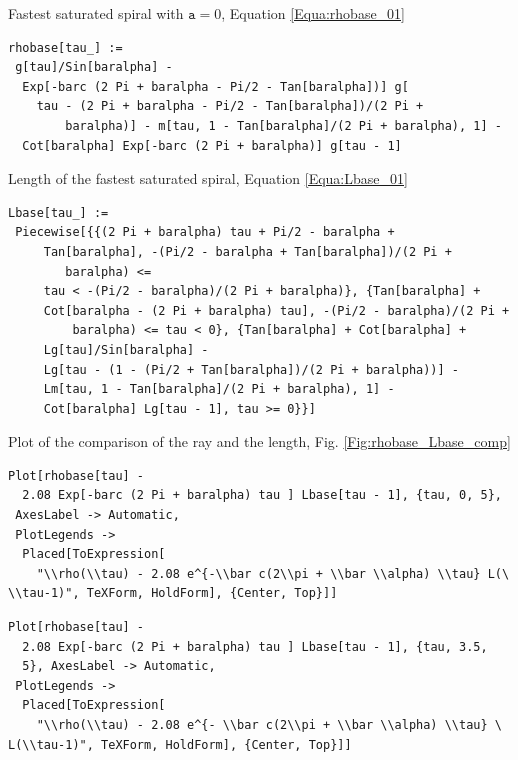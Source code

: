 \documentclass[reqno]{amsart}
\theoremstyle{definition} \newtheorem{definition}{Definition}[section]
\theoremstyle{definition} \newtheorem{remark}[definition]{Remark}
\theoremstyle{plain} \newtheorem{lemma}[definition]{Lemma}
\theoremstyle{plain} \newtheorem{proposition}[definition]{Proposition}
\theoremstyle{plain} \newtheorem{theorem}[definition]{Theorem}
\theoremstyle{plain} \newtheorem{corollary}[definition]{Corollary}
\theoremstyle{definition} \newtheorem{example}[definition]{Example}
\theoremstyle{plain} \newtheorem{claim}[clai]{Claim}
\theoremstyle{definition} \newtheorem{assumption}[definition]{Assumption}
\theoremstyle{definition} \newtheorem{observation}[definition]{Observation}
\newcommand{\1}{\mathbbm 1}
\numberwithin{equation}{section} %
\theoremstyle{plain} \newtheorem*{theorem*}{Theorem}
\theoremstyle{plain} \newtheorem{mthm}[maintheorem]{Main Theorem}
\theoremstyle{plain} \newtheorem*{mthm*}{Main Theorem}
\theoremstyle{plain} \newtheorem*{conjecture*}{Conjecture}
\theoremstyle{plain} \newtheorem{conjecture}[definition]{Conjecture}
\theoremstyle{plain} \newtheorem*{problem*}{Problem}
\begin{document}
\bigskip


\bigskip

\noindent Fastest saturated spiral with $\mathtt a = 0$, Equation \eqref{Equa:rhobase_01}
\medskip
\begin{verbatim}
rhobase[tau_] := 
 g[tau]/Sin[baralpha] - 
  Exp[-barc (2 Pi + baralpha - Pi/2 - Tan[baralpha])] g[
    tau - (2 Pi + baralpha - Pi/2 - Tan[baralpha])/(2 Pi + 
        baralpha)] - m[tau, 1 - Tan[baralpha]/(2 Pi + baralpha), 1] - 
  Cot[baralpha] Exp[-barc (2 Pi + baralpha)] g[tau - 1]
\end{verbatim}
\medskip
Length of the fastest saturated spiral, Equation \eqref{Equa:Lbase_01}
\medskip
\begin{verbatim}
Lbase[tau_] := 
 Piecewise[{{(2 Pi + baralpha) tau + Pi/2 - baralpha + 
     Tan[baralpha], -(Pi/2 - baralpha + Tan[baralpha])/(2 Pi + 
        baralpha) <= 
     tau < -(Pi/2 - baralpha)/(2 Pi + baralpha)}, {Tan[baralpha] + 
     Cot[baralpha - (2 Pi + baralpha) tau], -(Pi/2 - baralpha)/(2 Pi +
         baralpha) <= tau < 0}, {Tan[baralpha] + Cot[baralpha] + 
     Lg[tau]/Sin[baralpha] - 
     Lg[tau - (1 - (Pi/2 + Tan[baralpha])/(2 Pi + baralpha))] - 
     Lm[tau, 1 - Tan[baralpha]/(2 Pi + baralpha), 1] - 
     Cot[baralpha] Lg[tau - 1], tau >= 0}}]
\end{verbatim}
\medskip
Plot of the comparison of the ray and the length, Fig. \ref{Fig:rhobase_Lbase_comp}
\medskip
\begin{verbatim}
Plot[rhobase[tau] - 
  2.08 Exp[-barc (2 Pi + baralpha) tau ] Lbase[tau - 1], {tau, 0, 5}, 
 AxesLabel -> Automatic, 
 PlotLegends -> 
  Placed[ToExpression[
    "\\rho(\\tau) - 2.08 e^{-\\bar c(2\\pi + \\bar \\alpha) \\tau} L(\
\\tau-1)", TeXForm, HoldForm], {Center, Top}]]
\end{verbatim}
\begin{verbatim}
Plot[rhobase[tau] - 
  2.08 Exp[-barc (2 Pi + baralpha) tau ] Lbase[tau - 1], {tau, 3.5, 
  5}, AxesLabel -> Automatic, 
 PlotLegends -> 
  Placed[ToExpression[
    "\\rho(\\tau) - 2.08 e^{- \\bar c(2\\pi + \\bar \\alpha) \\tau} \
L(\\tau-1)", TeXForm, HoldForm], {Center, Top}]]
\end{verbatim}
\end{document}
